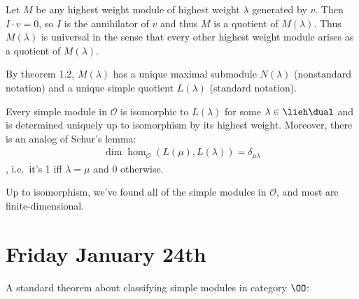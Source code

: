 \begin{theorem}

Let \(M\) be any highest weight module of highest weight \(\lambda\)
generated by \(v\). Then \(I\cdot v = 0\), so \(I\) is the annihilator
of \(v\) and thus \(M\) is a quotient of \(M(\lambda)\). Thus
\(M(\lambda)\) is universal in the sense that every other highest weight
module arises as a quotient of \(M(\lambda)\).

\end{theorem}

\begin{remark}

By theorem 1.2, \(M(\lambda)\) has a unique maximal submodule
\(N(\lambda)\) (nonstandard notation) and a unique simple quotient
\(L(\lambda)\) (standard notation).

\end{remark}

\begin{theorem}

Every simple module in \(\mathcal O\) is isomorphic to \(L(\lambda)\)
for some \(\lambda \in \lieh\dual\) and is determined uniquely up to
isomorphism by its highest weight. Moreover, there is an analog of
Schur's lemma:
\begin{align*}\dim \hom_{\mathcal O}(L(\mu), L(\lambda)) = \delta_{\mu\lambda}\end{align*},
i.e.~it's 1 iff \(\lambda=\mu\) and 0 otherwise.

\end{theorem}

\begin{remark}

Up to isomorphism, we've found all of the simple modules in
\(\mathcal O\), and most are finite-dimensional.

\end{remark}

\hypertarget{friday-january-24th}{%
\section{Friday January 24th}\label{friday-january-24th}}

A standard theorem about classifying simple modules in category \(\OO\):

